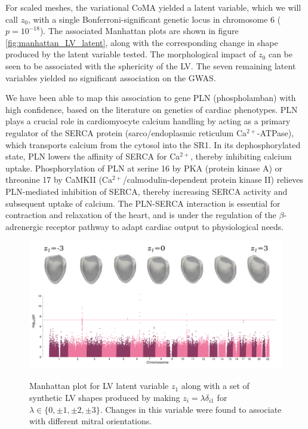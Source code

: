 For scaled meshes, the variational CoMA yielded a latent variable, which we will call $z_0$, with a single Bonferroni-significant genetic locus in chromosome 6 ($p=10^{-18}$). The associated Manhattan plots are shown in figure \ref{fig:manhattan_LV_latent}, along with the corresponding change in shape produced by the latent variable tested. The morphological impact of $z_0$ can be seen to be associated with the sphericity of the LV. The seven remaining latent variables yielded no significant association on the GWAS.

We have been able to map this association to gene PLN (phospholamban) with high confidence, based on the literature on genetics of cardiac phenotypes. 
PLN plays a crucial role in cardiomyocyte calcium handling by acting as a primary regulator of the SERCA protein (sarco/endoplasmic reticulum Ca$^{2+}$-ATPase), which transports calcium from the cytosol into the SR1. In its dephosphorylated state, PLN lowers the affinity of SERCA for Ca$^{2+}$, thereby inhibiting calcium uptake. Phosphorylation of PLN at serine 16 by PKA (protein kinase A) or threonine 17 by CaMKII (Ca$^{2+}$/calmodulin-dependent protein kinase II) relieves PLN-mediated inhibition of SERCA, thereby increasing SERCA activity and subsequent uptake of calcium. The PLN-SERCA interaction is essential for contraction and relaxation of the heart, and is under the regulation of the $\beta$-adrenergic receptor pathway to adapt cardiac output to physiological needs. \cite{maclennan_2003}

\begin{figure}[ht!]
\includegraphics[width=\textwidth]{figs/gwas/GWAS_Experiment2_z1_unscaled_meshes.png}
\label{fig:manhattan_LV_latent_unscaled}
\caption{Manhattan plot for LV latent variable $z_1$ along with a set of synthetic LV shapes produced by making $z_i=\lambda \delta_{i1}$ for $\lambda\in\{0, \pm 1, \pm 2, \pm 3\}$. Changes in this variable were found to associate with different mitral orientations.}
\end{figure}

